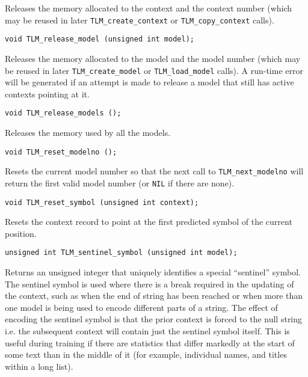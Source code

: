 \documentclass[11pt]{article}
\begin{document}
{\vspace{-0.2cm}
Releases the memory allocated to the context and the context number (which may
be reused in later \verb|TLM_create_context| or \verb|TLM_copy_context| calls).

\begin{verbatim}
void TLM_release_model (unsigned int model);
\end{verbatim}

\vspace{-0.2cm}
Releases the memory allocated to the model and the model number (which may
be reused in later \verb|TLM_create_model| or \verb|TLM_load_model|
calls). A run-time error will be generated if an attempt is made to release
a model that still has active contexts pointing at it.

\begin{verbatim}
void TLM_release_models ();
\end{verbatim}

\vspace{-0.2cm}
Releases the memory used by all the models.

\begin{verbatim}
void TLM_reset_modelno ();
\end{verbatim}

\vspace{-0.2cm}
Resets the current model number so that the next call to
\verb|TLM_next_modelno| will return the first valid model number (or
\verb|NIL| if there are none).

\begin{verbatim}
void TLM_reset_symbol (unsigned int context);
\end{verbatim}

\vspace{-0.2cm}
Resets the context record to point at the first predicted symbol of the
current position.

\begin{verbatim}
unsigned int TLM_sentinel_symbol (unsigned int model);
\end{verbatim}

\vspace{-0.2cm}
Returns an unsigned integer that uniquely identifies a special ``sentinel''
symbol. The sentinel symbol is used where there is a break required in the
updating of the context, such as when the end of string has been reached
or when more than one model is being used to encode different parts of
a string. The effect of encoding the sentinel symbol is that the prior
context is forced to the null string i.e. the subsequent context will contain
just the sentinel symbol itself. This is useful during training if there are
statistics that differ markedly at the start of some text than in the middle
of it (for example, individual names, and titles within a long list).

}
\end{document}
